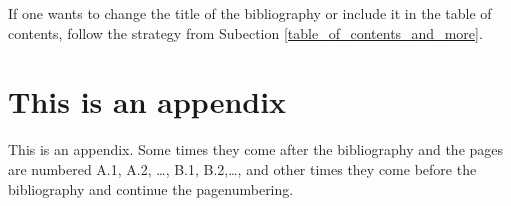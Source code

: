\documentclass[a4paper,12pt,twoside,openright,titlepage]{book}
\begin{document}
If one wants to change the title of the bibliography or include it in the table of contents, follow the strategy from Subection \ref{table_of_contents_and_more}.

\appendix
\cleardoublepage{}
\chapter{This is an appendix}
This is an appendix. Some times they come after the bibliography and the pages are numbered A.1, A.2, \ldots, B.1, B.2,\ldots, and other times they come before the bibliography and continue the pagenumbering. 
\backmatter
\cleardoublepage{}


\end{document}
